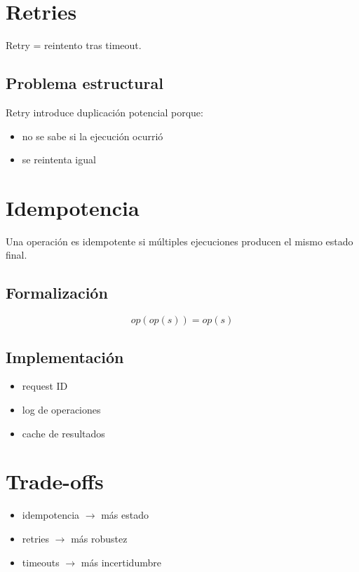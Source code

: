 \documentclass[variant=apuntes,cover=institutional,mode=screen]{ua-engineering-v6-article}
\begin{document}
\section{Retries}

Retry = reintento tras timeout.

\subsection{Problema estructural}

Retry introduce duplicación potencial porque:

\begin{itemize}
\item no se sabe si la ejecución ocurrió
\item se reintenta igual
\end{itemize}

\section{Idempotencia}

Una operación es idempotente si múltiples ejecuciones producen el mismo estado final.

\subsection{Formalización}

\[
op(op(s)) = op(s)
\]

\subsection{Implementación}

\begin{itemize}
\item request ID
\item log de operaciones
\item cache de resultados
\end{itemize}

\section{Trade-offs}

\begin{itemize}
\item idempotencia $\to$ más estado
\item retries $\to$ más robustez
\item timeouts $\to$ más incertidumbre
\end{itemize}
\end{document}
